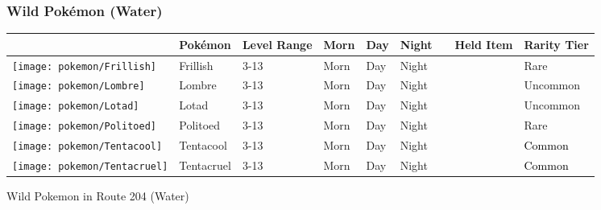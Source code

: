 \subsubsection{Wild Pokémon (Water)}%
\label{ssubsec:WildPokmon(Water)}%
\begin{longtable}{||l l l l l l l l l||}%
\hline%
\rowcolor{WaterColor}%
&Pokémon&Level Range&Morn&Day&Night&&Held Item&Rarity Tier\\%
\hline%
\endhead%
\hline%
\rowcolor{WaterColor}%
\texttt{[image: pokemon/Frillish]}&Frillish&3{-}13&Morn&Day&Night&&&\textcolor{RedOrange}{%
Rare%
}\\%
\hline%
\rowcolor{WaterColor}%
\texttt{[image: pokemon/Lombre]}&Lombre&3{-}13&Morn&Day&Night&&&\textcolor{OliveGreen}{%
Uncommon%
}\\%
\hline%
\rowcolor{WaterColor}%
\texttt{[image: pokemon/Lotad]}&Lotad&3{-}13&Morn&Day&Night&&&\textcolor{OliveGreen}{%
Uncommon%
}\\%
\hline%
\rowcolor{WaterColor}%
\texttt{[image: pokemon/Politoed]}&Politoed&3{-}13&Morn&Day&Night&&&\textcolor{RedOrange}{%
Rare%
}\\%
\hline%
\rowcolor{WaterColor}%
\texttt{[image: pokemon/Tentacool]}&Tentacool&3{-}13&Morn&Day&Night&&&\textcolor{black}{%
Common%
}\\%
\hline%
\rowcolor{WaterColor}%
\texttt{[image: pokemon/Tentacruel]}&Tentacruel&3{-}13&Morn&Day&Night&&&\textcolor{black}{%
Common%
}\\%
\hline%
\end{longtable}%
\caption{Wild Pokemon in Route 204 (Water)}